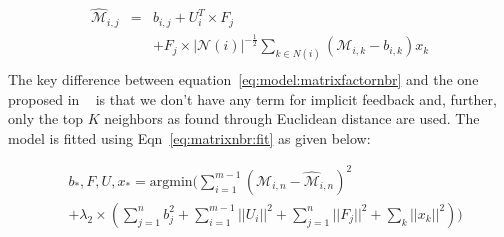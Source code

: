 \vspace{-1em}
\begin{equation}
  \label{eq:model:matrixfactornbr}
  \begin{array}{lcl}
    \widehat{\mathcal{M}}_{i,j} & = &  b_{i,j} + U_i^T\times F_j \\
                                &   & + F_j \times |\mathcal{N}(i)|^{-\frac{1}{2}}\sum_{k \in N(i)} (\mathcal{M}_{i,k} - b_{i,k}) x_k \\
  \end{array}
\end{equation}
\noindent
The key difference between equation~\ref{eq:model:matrixfactornbr} and the one proposed in 
~\cite{koren2008factor} is that we don't have any term for implicit feedback and, further,
only the top $K$ neighbors as found through Euclidean distance are used. 
The model is fitted using Eqn~\ref{eq:matrixnbr:fit} as given below:

\vspace{-1em}
\begin{equation}
  \label{eq:matrixnbr:fit}
  \begin{array}{ll}
    & b_*, F, U, x_*  = \textrm{argmin} (\sum \limits_{i=1}^{m-1} \left(\mathcal{M}_{i,n} - \widehat{\mathcal{M}}_{i,n}   \right)^2 \\
                    & + \lambda_2\times(\sum \limits_{j=1}^{n}b_j^2 + \sum \limits_{i=1}^{m-1} || U_i||^2 + \sum \limits_{j=1}^{n} || F_j||^2 + \sum_k ||x_k||^2))
  \end{array}
  \end{equation}


